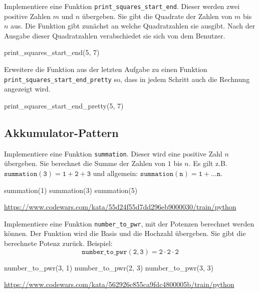 \documentclass[class=scrartcl, crop=false]{standalone}
\begin{document}
\begin{aufgabe} \noindent
Implementiere eine Funktion \texttt{print_squares_start_end}. Dieser werden zwei  positive Zahlen $m$ und $n$ übergeben. Sie gibt die Quadrate der Zahlen von $m$ bis $n$ aus. Die Funktion gibt zunächst an welche Quadratzahlen sie  ausgibt. Nach der Ausgabe dieser Quadratzahlen verabschiedet sie sich von dem Benutzer.

\begin{pyconsole}
print_squares_start_end(5, 7)
\end{pyconsole}

\end{aufgabe}

\begin{aufgabe}
Erweitere die Funktion aus der letzten Aufgabe zu einen Funktion \texttt{print_squares_start_end_pretty} so, dass in jedem Schritt auch die Rechnung angezeigt wird.
\end{aufgabe}

\begin{pyconsole}
print_squares_start_end_pretty(5, 7)
\end{pyconsole}

\subsection{Akkumulator-Pattern}

\begin{aufgabe} \noindent
Implementiere eine Funktion \texttt{summation}. Dieser wird eine positive Zahl $n$ übergeben. Sie berechnet die Summe der Zahlen von $1$ bis $n$. Es gilt z.B. $ \mathtt{summation} (\mathtt{3}) = \mathtt{1} + \mathtt{2} + \mathtt{3}$ und allgemein: $ \mathtt{summation} (\mathtt{n}) =  \mathtt{1} + \dots \mathtt{n}$.

\begin{pyconsole}
summation(1)
summation(3)
summation(5)
\end{pyconsole}

\noindent\url{https://www.codewars.com/kata/55d24f55d7dd296eb9000030/train/python}

\end{aufgabe}


\begin{aufgabe} \noindent
Implementiere eine Funktion \texttt{number_to_pwr}, mit der Potenzen berechnet werden können. Der Funktion wird die Basis und die Hochzahl übergeben. Sie gibt die berechnete Potenz zurück. Beispiel:
$$ \mathtt{number\_to\_pwr} (\mathtt{2, 3}) =  \mathtt{2 \cdot 2  \cdot 2}$$

\begin{pyconsole}
number_to_pwr(3, 1)
number_to_pwr(2, 3)
number_to_pwr(3, 3)
\end{pyconsole}

\noindent\url{https://www.codewars.com/kata/562926c855ca9fdc4800005b/train/python}

\end{aufgabe}
\end{document}
